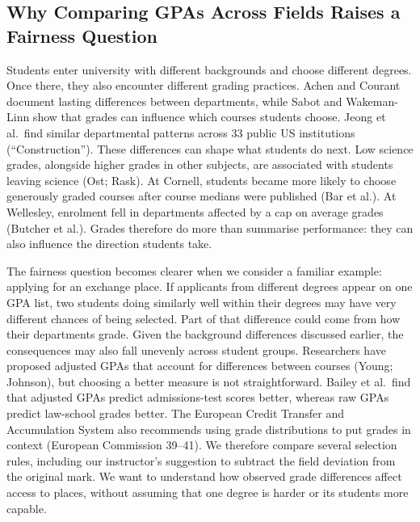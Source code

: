 \subsection{Why Comparing GPAs Across Fields Raises a Fairness Question}
\label{sec:fairness}

Students enter university with different backgrounds and choose different degrees. Once there, they also encounter different grading practices. Achen and Courant document lasting differences between departments, while Sabot and Wakeman-Linn show that grades can influence which courses students choose. Jeong et al.\ find similar departmental patterns across 33 public US institutions (``Construction''). These differences can shape what students do next. Low science grades, alongside higher grades in other subjects, are associated with students leaving science (Ost; Rask). At Cornell, students became more likely to choose generously graded courses after course medians were published (Bar et al.). At Wellesley, enrolment fell in departments affected by a cap on average grades (Butcher et al.). Grades therefore do more than summarise performance: they can also influence the direction students take.

The fairness question becomes clearer when we consider a familiar example: applying for an exchange place. If applicants from different degrees appear on one GPA list, two students doing similarly well within their degrees may have very different chances of being selected. Part of that difference could come from how their departments grade. Given the background differences discussed earlier, the consequences may also fall unevenly across student groups. Researchers have proposed adjusted GPAs that account for differences between courses (Young; Johnson), but choosing a better measure is not straightforward. Bailey et al.\ find that adjusted GPAs predict admissions-test scores better, whereas raw GPAs predict law-school grades better. The European Credit Transfer and Accumulation System also recommends using grade distributions to put grades in context (European Commission 39--41). We therefore compare several selection rules, including our instructor's suggestion to subtract the field deviation from the original mark. We want to understand how observed grade differences affect access to places, without assuming that one degree is harder or its students more capable.
